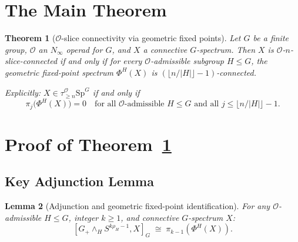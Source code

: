 \documentclass[12pt]{article}
\newtheorem{theorem}{Theorem}
\newtheorem{lemma}[theorem]{Lemma}
\theoremstyle{definition}
\newcommand{\calO}{\mathcal{O}}
\newcommand{\SpG}{\mathrm{Sp}^G}
\newcommand{\floor}[1]{\lfloor #1 \rfloor}
\begin{document}
\section{The Main Theorem}

\begin{theorem}[$\calO$-slice connectivity via geometric fixed points]
\label{thm:main}
Let $G$ be a finite group, $\calO$ an $N_\infty$ operad for $G$, and $X$ a connective
$G$-spectrum. Then $X$ is $\calO$-$n$-slice-connected if and only if for every
$\calO$-admissible subgroup $H \leq G$, the geometric fixed-point spectrum $\Phi^H(X)$ is
$(\floor{n/|H|} - 1)$-connected.

Explicitly: $X \in \tau_{\geq n}^{\calO}\SpG$ if and only if
\begin{equation}
\label{eq:main-condition}
  \pi_j\!\bigl(\Phi^H(X)\bigr) = 0
  \quad \text{for all $\calO$-admissible $H \leq G$ and all } j \leq \floor{n/|H|} - 1.
\end{equation}
\end{theorem}

\section{Proof of Theorem~\ref{thm:main}}

\subsection{Key Adjunction Lemma}

\begin{lemma}[Adjunction and geometric fixed-point identification]
\label{lem:adjunction}
For any $\calO$-admissible $H \leq G$, integer $k \geq 1$, and connective $G$-spectrum $X$:
\begin{equation}
\label{eq:adjunction}
  [G_+ \wedge_H S^{k\rho_H - 1}, X]_G \;\cong\; \pi_{k-1}(\Phi^H(X)).
\end{equation}
\end{lemma}
\end{document}
